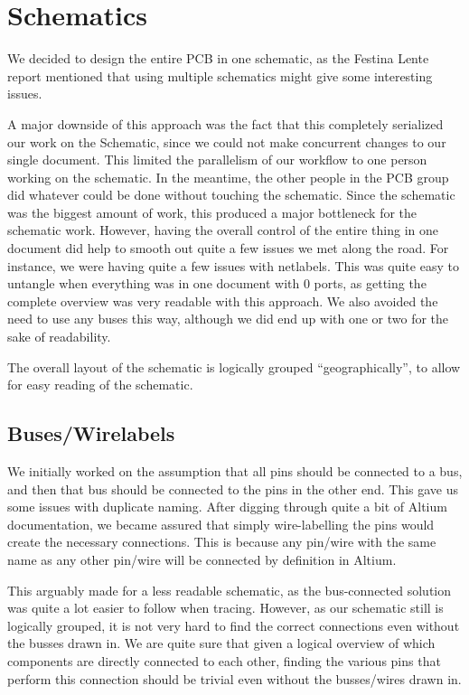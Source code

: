 \section {Schematics}

We decided to design the entire PCB in one schematic, as the Festina Lente
report mentioned that using multiple schematics might give
some interesting issues.

A major downside of this approach was the fact that this completely serialized
our work on the Schematic, since we could not make concurrent changes to our
single document. This limited the parallelism of our workflow to one person
working on the schematic. In the meantime, the other people in the PCB group did
whatever could be done without touching the schematic. Since the schematic was
the biggest amount of work, this produced a major bottleneck for the schematic
work. However, having the overall control of the entire thing in one document
did help to smooth out quite a few issues we met along the road. For instance,
we were having quite a few issues with netlabels. This was quite easy to
untangle when everything was in one document with 0 ports, as getting the
complete overview was very readable with this approach. We also avoided the need
to use any buses this way, although we did end up with one or two for the sake
of readability. 

The overall layout of the schematic is logically grouped ``geographically'', to
allow for easy reading of the schematic.

\subsection {Buses/Wirelabels}
We initially worked on the assumption that all pins should be connected to a
bus, and then that bus should be connected to the pins in the other end. This
gave us some issues with duplicate naming. After digging through quite a bit of
Altium documentation, we became assured that simply wire-labelling the pins
would create the necessary connections. This is because any pin/wire with the
same name as any other pin/wire will be connected by definition in Altium.

This arguably made for a less readable schematic, as the bus-connected solution
was quite a lot easier to follow when tracing. However, as our schematic still
is logically grouped, it is not very hard to find the correct connections even
without the busses drawn in. We are quite sure that given a logical overview of
which components are directly connected to each other, finding the various pins
that perform this connection should be trivial even without the busses/wires
drawn in.

